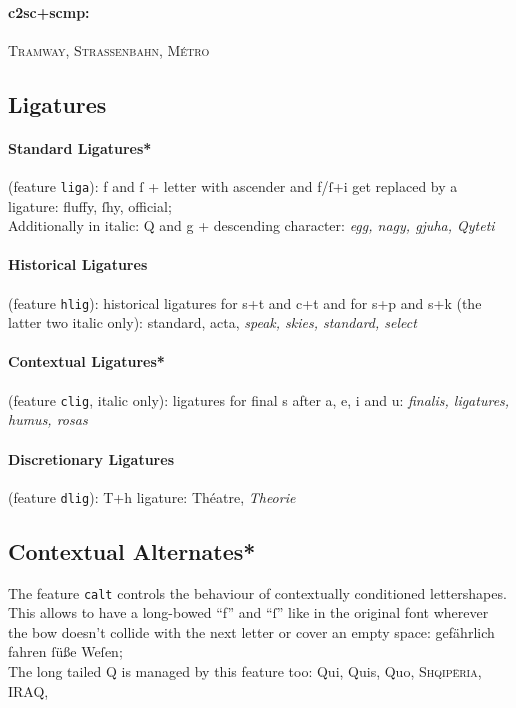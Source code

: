 \documentclass[pagesize,DIV14]{scrartcl}
\begin{document}
\paragraph*{c2sc+scmp:} \textsc{Tramway, Straßenbahn, Métro}

\subsection{Ligatures}
\paragraph*{Standard Ligatures*} (feature \texttt{liga}): f and ſ + letter with ascender and f/ſ+i get replaced by a ligature: fluffy, ſhy, official;\\
Additionally in italic: Q and g + descending character: \textit{egg, nagy, gjuha, Qyteti} 
\paragraph*{Historical Ligatures} (feature \texttt{hlig}): historical ligatures for s+t and c+t and for s+p and s+k (the latter two italic only): {standard, acta, \textit{speak, skies, standard, select}}
\paragraph*{Contextual Ligatures*} (feature \texttt{clig}, italic only): ligatures for final s after a, e, i and u: \textit{%
finalis, ligatures, humus, rosas}
\paragraph*{Discretionary Ligatures} (feature \texttt{dlig}): T+h ligature:  Théatre, \textit{Theorie}

\subsection{Contextual Alternates*}
The feature \texttt{calt} controls the behaviour of contextually conditioned lettershapes. This allows to have a long-bowed \enquote{f} and \enquote{ſ} like in the original font wherever the bow doesn’t collide with the next letter or cover an empty space: gefährlich fahren ſüße Weſen;\\
The long tailed Q is managed by this feature too: Qui, Quis, Quo, \textsc{Shqipëria}, IRAQ, 
\end{document}

